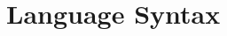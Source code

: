 \newcommand{\token}[1]{\fcolorbox{black}{lightgray}{\strut\texttt{#1}}}


\newcommand{\nullc}{\token{null}}
\newcommand{\comma}{\token{,}}
\newcommand{\dott}{\token{.}}
\newcommand{\lb}{\token{(}\;}
\newcommand{\rb}{\;\token{)}}
\newcommand{\lsb}{\token{[}\;}
\newcommand{\rsb}{\;\token{]}}
\newcommand{\lcb}{\token{\{}\;}
\newcommand{\rcb}{\;\token{\}}}
\newcommand{\vbar}{\token{|}}

\chapter{Language Syntax}

